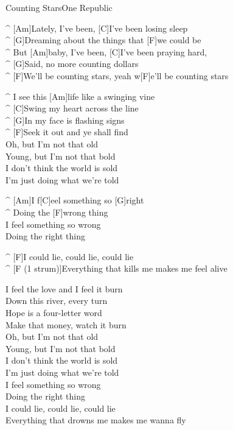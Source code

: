 \begin{song}{Counting Stars}{One Republic}

\begin{guitar}
^ [Am]Lately, I've been, [C]I've been losing sleep\\
^ [G]Dreaming about the things that [F]we could be\\
^ But [Am]baby, I've been, [C]I've been praying hard,\\
^ [G]Said, no more counting dollars\\
^ [F]We'll be counting stars, yeah w[F]e'll be counting stars\\
\end{guitar}

\pagebreak
{}
\begin{guitar}
^ I see this [Am]life like a swinging vine\\
^ [C]Swing my heart across the line\\
^ [G]In my face is flashing signs\\
^ [F]Seek it out and ye shall find\\
Oh, but I'm not that old\\
Young, but I'm not that bold\\
I don't think the world is sold\\
I'm just doing what we're told\\
\end{guitar}

\begin{guitar}
^ [Am]I f[C]eel something so [G]right\\
^ Doing the [F]wrong thing\\
I feel something so wrong\\
Doing the right thing\\
\end{guitar}

\begin{guitar}
^ [F]I could lie, could lie, could lie\\
^ [F (1 strum)]Everything that kills me makes me feel alive\\
\end{guitar}



\begin{guitar}
I feel the love and I feel it burn\\
Down this river, every turn\\
Hope is a four-letter word\\
Make that money, watch it burn\\
Oh, but I'm not that old\\
Young, but I'm not that bold\\
I don't think the world is sold\\
I'm just doing what we're told\\
  I feel something so wrong\\
Doing the right thing\\
I could lie, could lie, could lie\\
Everything that drowns me makes me wanna fly\\
\end{guitar}


\end{song}

